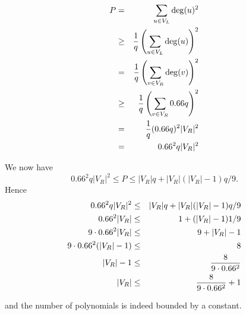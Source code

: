 \documentclass[11pt]{article} \usepackage{amssymb}
\begin{document}
\begin{enumerate}
   \begin{eqnarray*}
      P&=&\sum_{u\in V_L}\deg(u)^2
      \\ &\geq&{1\over q}\left(\sum_{u\in V_L}\deg(u)\right)^2
      \\ &=&{1\over q}\left(\sum_{v\in V_R}\deg(v)\right)^2
      \\ &\geq&{1\over q}\left(\sum_{v\in V_R}0.66q\right)^2
      \\ &=&{1\over q}(0.66q)^2|V_R|^2
      \\ &=&0.66^2q|V_R|^2
    \end{eqnarray*}

   We now have
   \begin{equation*}
     0.66^2q|V_R|^2\leq P\leq |V_R|q + |V_R|(|V_R|-1)q/9.
   \end{equation*}
   Hence
   \begin{eqnarray*}
     0.66^2q|V_R|^2&\leq& |V_R|q + |V_R|(|V_R|-1)q/9
     \\ 0.66^2|V_R|&\leq& 1 + (|V_R|-1)1/9
     \\ 9\cdot0.66^2|V_R|&\leq& 9 + |V_R|-1
     \\ 9\cdot0.66^2(|V_R|-1)&\leq& 8
     \\ |V_R|-1&\leq& {8\over 9\cdot0.66^2}
     \\ |V_R|&\leq& {8\over 9\cdot0.66^2}+1
   \end{eqnarray*}
   
   and the number of polynomials is indeed bounded by a constant.
\end{enumerate}
\end{document}
